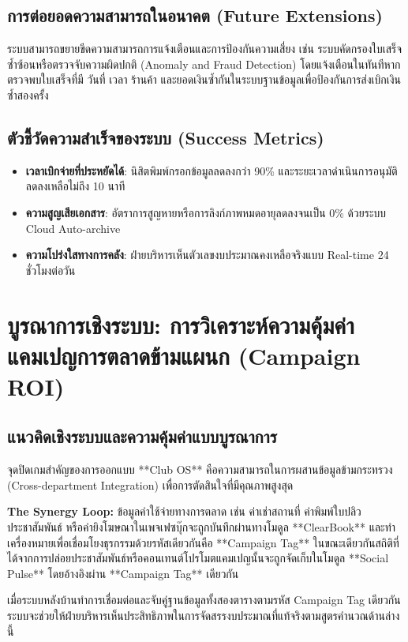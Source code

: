 \documentclass[10pt,a4paper]{article}
\begin{document}
\subsection{การต่อยอดความสามารถในอนาคต (Future Extensions)}
ระบบสามารถขยายขีดความสามารถการแจ้งเตือนและการป้องกันความเสี่ยง เช่น ระบบคัดกรองใบเสร็จซ้ำซ้อนหรือตรวจจับความผิดปกติ (Anomaly and Fraud Detection) โดยแจ้งเตือนในทันทีหากตรวจพบใบเสร็จที่มี วันที่ เวลา ร้านค้า และยอดเงินซ้ำกันในระบบฐานข้อมูลเพื่อป้องกันการส่งเบิกเงินซ้ำสองครั้ง

\subsection{ตัวชี้วัดความสำเร็จของระบบ (Success Metrics)}
\begin{itemize}
  \item \textbf{เวลาเบิกจ่ายที่ประหยัดได้}: นิสิตพิมพ์กรอกข้อมูลลดลงกว่า 90\% และระยะเวลาดำเนินการอนุมัติลดลงเหลือไม่ถึง 10 นาที
  \item \textbf{ความสูญเสียเอกสาร}: อัตราการสูญหายหรือการลิงก์ภาพหมดอายุลดลงจนเป็น 0\% ด้วยระบบ Cloud Auto-archive
  \item \textbf{ความโปร่งใสทางการคลัง}: ฝ่ายบริหารเห็นตัวเลขงบประมาณคงเหลือจริงแบบ Real-time 24 ชั่วโมงต่อวัน
\end{itemize}

\newpage

\section{บูรณาการเชิงระบบ: การวิเคราะห์ความคุ้มค่าแคมเปญการตลาดข้ามแผนก (Campaign ROI)}
\subsection{แนวคิดเชิงระบบและความคุ้มค่าแบบบูรณาการ}
จุดปิดเกมสำคัญของการออกแบบ **Club OS** คือความสามารถในการผสานข้อมูลข้ามกระทรวง (Cross-department Integration) เพื่อการตัดสินใจที่มีคุณภาพสูงสุด 

\begin{highlightbox}
  \noindent \textbf{The Synergy Loop:} 
  ข้อมูลค่าใช้จ่ายทางการตลาด เช่น ค่าเช่าสถานที่ ค่าพิมพ์ใบปลิวประชาสัมพันธ์ หรือค่ายิงโฆษณาในเพจเฟซบุ๊กจะถูกบันทึกผ่านทางโมดูล **ClearBook** และทำเครื่องหมายเพื่อเชื่อมโยงธุรกรรมด้วยรหัสเดียวกันคือ **Campaign Tag** ในขณะเดียวกันสถิติที่ได้จากการปล่อยประชาสัมพันธ์หรือคอนเทนต์โปรโมตแคมเปญนั้นจะถูกจัดเก็บในโมดูล **Social Pulse** โดยอ้างอิงผ่าน **Campaign Tag** เดียวกัน 

  เมื่อระบบหลังบ้านทำการเชื่อมต่อและจับคู่ฐานข้อมูลทั้งสองตารางตามรหัส Campaign Tag เดียวกัน ระบบจะช่วยให้ฝ่ายบริหารเห็นประสิทธิภาพในการจัดสรรงบประมาณที่แท้จริงตามสูตรคำนวณด้านล่างนี้
\end{highlightbox}
\end{document}
